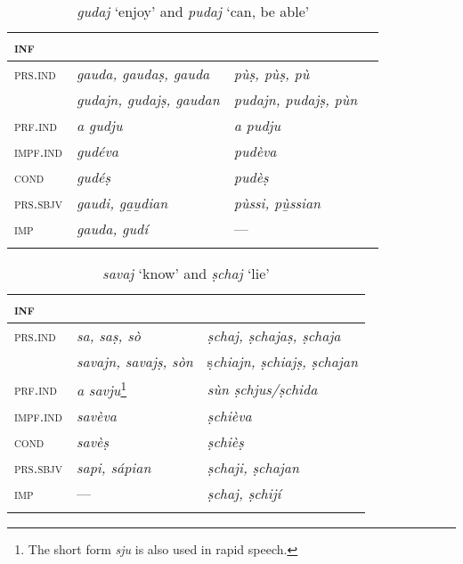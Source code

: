 \begin{table}
\small
	\caption{\textit{gudaj} `enjoy' and \textit{pudaj} `can, be able'}

	\begin{tabular}{llll}
		\lsptoprule
		\textsc{inf} & \isi{\textbf{\textit{gudaj}}} & \isi{\textit{\textbf{pudaj}}} \\
		\midrule
		\textsc{prs.ind} & \textit{gauda, gaudaṣ, gauda} & \textit{pùṣ, pùṣ, pù}\\
		& \textit{gudajn, gudajṣ, gaudan} & \textit{pudajn, pudajṣ, pùn}\\
		\textsc{prf.ind} & \textit{a gudju} & \textit{a pudju}\\
		\textsc{impf.ind} & \textit{gudéva} & \textit{pudèva}\\
		\textsc{cond} & \textit{gudéṣ} & \textit{pudèṣ}\\
		\textsc{prs.sbjv} &\textit{gaudi, ga̱u̱dian} & \textit{pùssi, pù̱ssian}\\
		\textsc{imp} & \textit{gauda, gudí} & ---\\
		\lspbottomrule
	\end{tabular}
\end{table}


\begin{table}
\small
	\caption{\textit{savaj} `know' and \textit{ṣchaj} `lie'}

	\begin{tabular}{lll}
		\lsptoprule
		\textsc{inf} & \isi{\textbf{\textit{savaj}}} & \isi{\textbf{\textit{ṣchaj}}} \\
		\midrule
		\textsc{prs.ind} & \textit{sa, saṣ, sò} &  \textit{ṣchaj, ṣchajaṣ, ṣchaja} \\
		& \textit{savajn, savajṣ, sòn} & ṣ\textit{chiajn, ṣchiajṣ, ṣchajan} \\
		\textsc{prf.ind} & \textit{a savju}\footnote{The short form \textit{sju} is also used in rapid speech.} & \textit{sùn ṣchjus/ṣchida}\\
		\textsc{impf.ind} & \textit{savèva} & \textit{ṣchièva}\\
		\textsc{cond} & \textit{savèṣ} & \textit{ṣchièṣ}\\
		\textsc{prs.sbjv} & \textit{sapi, sápian} & \textit{ṣchaji, ṣchajan}\\
		\textsc{imp} & --- & \textit{ṣchaj, ṣchijí}\\
		\lspbottomrule
	\end{tabular}
\end{table}



